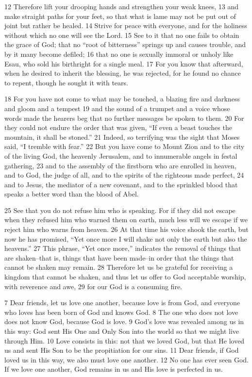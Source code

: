 \begin{bible}
12 Therefore lift your drooping hands and strengthen your weak knees, 13 and make straight paths for your feet, so that what is lame may not be put out of joint but rather be healed. 14 Strive for peace with everyone, and for the holiness without which no one will see the Lord. 15 See to it that no one fails to obtain the grace of God; that no ``root of bitterness'' springs up and causes trouble, and by it many become defiled; 16 that no one is sexually immoral or unholy like Esau, who sold his birthright for a single meal. 17 For you know that afterward, when he desired to inherit the blessing, he was rejected, for he found no chance to repent, though he sought it with tears.

18 For you have not come to what may be touched, a blazing fire and darkness and gloom and a tempest 19 and the sound of a trumpet and a voice whose words made the hearers beg that no further messages be spoken to them. 20 For they could not endure the order that was given, ``If even a beast touches the mountain, it shall be stoned.'' 21 Indeed, so terrifying was the sight that Moses said, ``I tremble with fear.'' 22 But you have come to Mount Zion and to the city of the living God, the heavenly Jerusalem, and to innumerable angels in festal gathering, 23 and to the assembly of the firstborn who are enrolled in heaven, and to God, the judge of all, and to the spirits of the righteous made perfect, 24 and to Jesus, the mediator of a new covenant, and to the sprinkled blood that speaks a better word than the blood of Abel.

25 See that you do not refuse him who is speaking. For if they did not escape when they refused him who warned them on earth, much less will we escape if we reject him who warns from heaven. 26 At that time his voice shook the earth, but now he has promised, ``Yet once more I will shake not only the earth but also the heavens.'' 27 This phrase, ``Yet once more,'' indicates the removal of things that are shaken--that is, things that have been made--in order that the things that cannot be shaken may remain. 28 Therefore let us be grateful for receiving a kingdom that cannot be shaken, and thus let us offer to God acceptable worship, with reverence and awe, 29 for our God is a consuming fire.

7 Dear friends, let us love one another, because love is from God, and everyone who loves has been born of God and knows God. 8 The one who does not love does not know God, because God is love. 9 God's love was revealed among us in this way: God sent His One and Only Son into the world so that we might live through Him. 10 Love consists in this: not that we loved God, but that He loved us and sent His Son to be the propitiation for our sins. 11 Dear friends, if God loved us in this way, we also must love one another. 12 No one has ever seen God. If we love one another, God remains in us and His love is perfected in us.
\end{bible}

